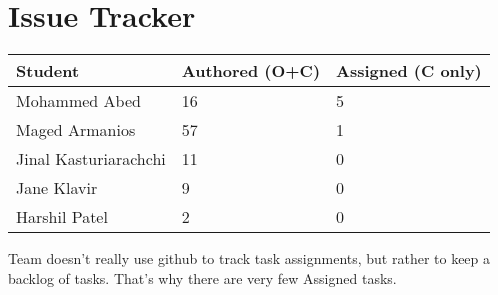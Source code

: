 \documentclass{article}
\begin{document}
\section{Issue Tracker}

\begin{table}[H]
\centering
\begin{tabular}{lll}
\toprule
\textbf{Student} & \textbf{Authored (O+C)} & \textbf{Assigned (C only)}\\
\midrule
Mohammed Abed & 16 & 5 \\
Maged Armanios & 57 & 1 \\
Jinal Kasturiarachchi & 11 & 0 \\
Jane Klavir & 9 & 0 \\
Harshil Patel & 2 & 0 \\
\bottomrule
\end{tabular}
\end{table}

Team doesn't really use github to track task assignments, but rather to keep a backlog of tasks. That's why there are very few Assigned tasks.
\end{document}
